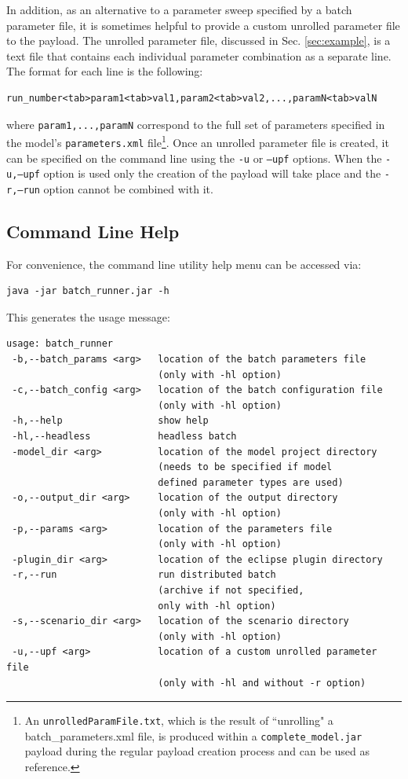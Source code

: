 \documentclass[11pt]{amsart}
\begin{document}
In addition, as an alternative to a parameter sweep specified by a batch parameter file, it is sometimes helpful to provide a custom unrolled parameter file to the payload. The unrolled parameter file, discussed in Sec. \ref{sec:example}, is a text file that contains each individual parameter combination as a separate line. The format for each line is the following:
\begin{verbatim}
run_number<tab>param1<tab>val1,param2<tab>val2,...,paramN<tab>valN
\end{verbatim}
where {\tt param1,...,paramN} correspond to the full set of parameters specified in the model's {\tt parameters.xml} file\footnote{ An {\tt unrolledParamFile.txt}, which is the result of ``unrolling" a batch\_parameters.xml file, is produced within a {\tt complete\_model.jar} payload during the regular payload creation process and can be used as reference.}. Once an unrolled parameter file is created, it can be specified on the command line using the {\tt-u} or {\tt--upf} options. When the {\tt-u,--upf} option is used only the creation of the payload will take place and the {\tt-r,--run} option cannot be combined with it.

\subsection{Command Line Help}

For convenience, the command line utility help menu can be accessed via:
\begin{verbatim}
java -jar batch_runner.jar -h
\end{verbatim}
\noindent This generates the usage message:
\begin{verbatim}
usage: batch_runner
 -b,--batch_params <arg>   location of the batch parameters file
                           (only with -hl option)
 -c,--batch_config <arg>   location of the batch configuration file
                           (only with -hl option)
 -h,--help                 show help
 -hl,--headless            headless batch
 -model_dir <arg>          location of the model project directory
                           (needs to be specified if model
                           defined parameter types are used)
 -o,--output_dir <arg>     location of the output directory
                           (only with -hl option)
 -p,--params <arg>         location of the parameters file
                           (only with -hl option)
 -plugin_dir <arg>         location of the eclipse plugin directory
 -r,--run                  run distributed batch
                           (archive if not specified,
                           only with -hl option)
 -s,--scenario_dir <arg>   location of the scenario directory
                           (only with -hl option)
 -u,--upf <arg>            location of a custom unrolled parameter file
                           (only with -hl and without -r option)
\end{verbatim}
\end{document}
